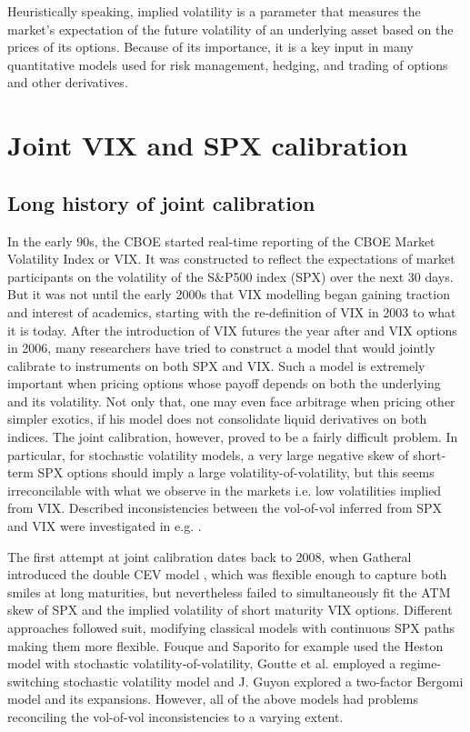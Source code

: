 Heuristically speaking, implied volatility is a parameter that measures the market's expectation of the future volatility of an underlying asset based on the prices of its options. Because of its importance, it is a key input in many quantitative models used for risk management, hedging, and trading of options and other derivatives.

\section{Joint VIX and SPX calibration}\label{sec:SPXnVIXintro}

\subsection{Long history of joint calibration}

In the early 90s, the CBOE started real-time reporting of the CBOE Market Volatility Index or VIX. It was constructed to reflect the expectations of market participants on the volatility of the S\&P500 index (SPX) over the next 30 days. But it was not until the early 2000s that VIX modelling began gaining traction and interest of academics, starting with the re-definition of VIX in 2003 to what it is today. After the introduction of VIX futures the year after and VIX options in 2006, many researchers have tried to construct a model that would jointly calibrate to instruments on both SPX and VIX. Such a model is extremely important when pricing options whose payoff depends on both the underlying and its volatility. Not only that, one may even face arbitrage when pricing other simpler exotics, if his model does not consolidate liquid derivatives on both indices. The joint calibration, however, proved to be a fairly difficult problem. In particular, for stochastic volatility models, a very large negative skew of short-term SPX options should imply a large volatility-of-volatility, but this seems irreconcilable with what we observe in the markets i.e. low volatilities implied from VIX. Described inconsistencies between the vol-of-vol inferred from SPX and VIX were investigated in e.g. \cite{Song2012APrices, Jacquier2021RoughOptions}.

The first attempt at joint calibration dates back to 2008, when Gatheral introduced the double CEV model \cite{Gatheral2008ConsistentOptions}, which was flexible enough to capture both smiles at long maturities, but nevertheless failed to simultaneously fit the ATM skew of SPX and the implied volatility of short maturity VIX options. Different approaches followed suit, modifying classical models with continuous SPX paths making them more flexible. %
Fouque and Saporito \cite{Fouque2018HestonOptions} for example used the Heston model with stochastic volatility-of-volatility, Goutte et al. \cite{Goutte2017Regime-switchingOptions} employed a regime-switching stochastic volatility model and J. Guyon \cite{Guyon2017OnOptions, Guyon2020TheSkew} explored a two-factor Bergomi model and its expansions. However, all of the above models had problems reconciling the vol-of-vol inconsistencies to a varying extent.


